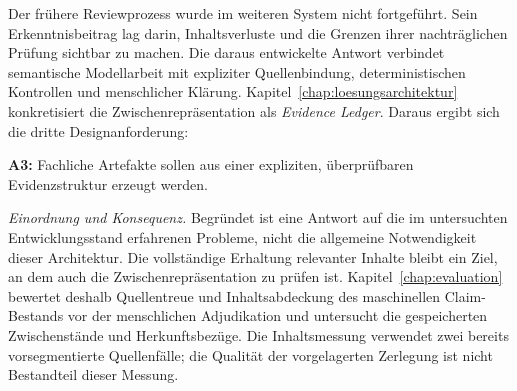 Der frühere Reviewprozess wurde im weiteren System nicht fortgeführt.
Sein Erkenntnisbeitrag lag darin, Inhaltsverluste und die Grenzen
ihrer nachträglichen Prüfung sichtbar zu machen. Die daraus
entwickelte Antwort verbindet semantische Modellarbeit mit expliziter
Quellenbindung, deterministischen Kontrollen und menschlicher
Klärung. Kapitel~\ref{chap:loesungsarchitektur} konkretisiert die
Zwischenrepräsentation als \emph{Evidence Ledger}. Daraus ergibt sich
die dritte Designanforderung:

\textbf{A3:} Fachliche Artefakte sollen aus einer expliziten, überprüfbaren
Evidenzstruktur erzeugt werden.

\emph{Einordnung und Konsequenz.} Begründet ist eine Antwort auf
die im untersuchten Entwicklungsstand erfahrenen Probleme, nicht
die allgemeine Notwendigkeit dieser Architektur. Die vollständige
Erhaltung relevanter Inhalte bleibt ein Ziel, an dem auch die
Zwischenrepräsentation zu prüfen ist. Kapitel~\ref{chap:evaluation}
bewertet deshalb Quellentreue und Inhaltsabdeckung des maschinellen
Claim-Bestands vor der menschlichen Adjudikation und untersucht die
gespeicherten Zwischenstände und Herkunftsbezüge. Die Inhaltsmessung
verwendet zwei bereits vorsegmentierte Quellenfälle; die Qualität
der vorgelagerten Zerlegung ist nicht Bestandteil dieser Messung.

